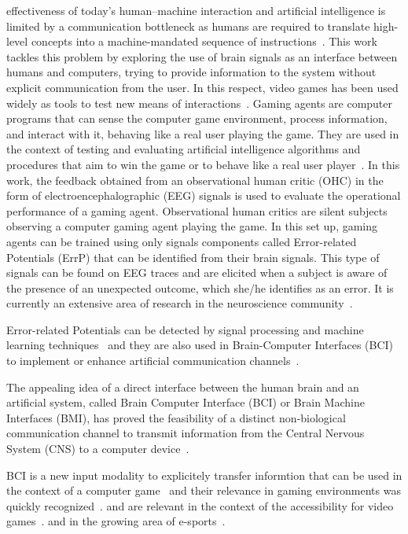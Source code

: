 \documentclass[journal]{IEEEtran}
\begin{document}
 effectiveness of today's human–machine interaction and artificial intelligence is limited by a communication bottleneck as humans are required to translate high-level concepts into a machine-mandated sequence of instructions~\cite{Xu2020,CURSOR-CONTROL-PAPER}.   This work tackles this problem by exploring the use of brain signals as an interface between humans and computers, trying to provide information to the system without explicit communication from the user.   In this respect, video games has been used widely as tools to test new means of interactions~\cite{Carter2014,Barr2007}. Gaming agents are computer programs that can sense the computer game environment, process information, and interact with it, behaving like a real user playing the game.  They are used in the context of testing and evaluating artificial intelligence algorithms and procedures that aim to win the game or to behave like a real user player~\cite{Zhao2020}.
In this work, the feedback obtained from an observational human critic (OHC) in the form of electroencephalographic (EEG) signals is used to evaluate the operational performance of a gaming agent.  Observational human critics are silent subjects observing a computer gaming agent playing the game. In this set up, gaming agents can be trained using only signals components called Error-related Potentials (ErrP) that can be identified from their brain signals.   This type of signals can be found on EEG traces and are elicited when a subject is aware of the presence of an unexpected outcome, which she/he identifies as an error.  It is currently an extensive area of research in the neuroscience community~\cite{Holroyd2009}.  

Error-related Potentials can be detected by signal processing and machine learning techniques~\cite{EERP-PAPER} and they are also used in Brain-Computer Interfaces (BCI) to implement or enhance artificial communication channels~\cite{Chavarriaga2014}.

The appealing idea of a direct interface between the human brain and an artificial system, called Brain Computer Interface (BCI) or Brain Machine Interfaces (BMI), has proved the feasibility of a distinct non-biological communication channel to transmit information from the Central Nervous System (CNS) to a computer device~\cite{Vasiljevic2020}.


BCI is a new input modality to explicitely transfer informtion that can be used in the context of a computer game~\cite{Scherer2012} and their relevance in gaming environments was quickly recognized~\cite{Nijholt2007}.
and are relevant in the context of the accessibility for video games~\cite{Aguado-Delgado2020}. and in the growing area of e-sports~\cite{Yakovlev2020}.
\end{document}
